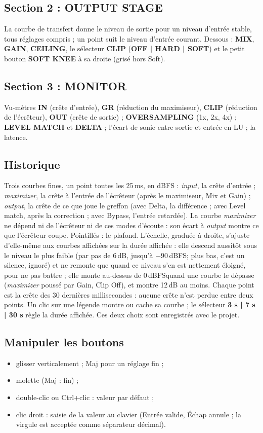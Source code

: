 \documentclass[a4paper,11pt]{article}
\newcommand{\ctl}[1]{\textsf{\textbf{#1}}}   %
\newcommand{\dB}{\,dB}
\newcommand{\dBFS}{\,dBFS}
\begin{document}
\subsection{Section 2 : OUTPUT STAGE}
La courbe de transfert donne le niveau de sortie pour un niveau d'entrée stable, tous réglages
compris ; un point suit le niveau d'entrée courant. Dessous : \ctl{MIX}, \ctl{GAIN},
\ctl{CEILING}, le sélecteur \ctl{CLIP} (\ctl{OFF | HARD | SOFT}) et le petit bouton
\ctl{SOFT KNEE} à sa droite (grisé hors Soft).

\subsection{Section 3 : MONITOR}
Vu-mètres \ctl{IN} (crête d'entrée), \ctl{GR} (réduction du maximiseur), \ctl{CLIP} (réduction
de l'écrêteur), \ctl{OUT} (crête de sortie) ; \ctl{OVERSAMPLING} (1x, 2x, 4x) ; \ctl{LEVEL
MATCH} et \ctl{DELTA} ; l'écart de sonie entre sortie et entrée en LU ; la latence.

\subsection{Historique}
Trois courbes fines, un point toutes les 25\,ms, en dBFS : \emph{input}, la crête d'entrée ;
\emph{maximizer}, la crête à l'entrée de l'écrêteur (après le maximiseur, Mix et Gain) ;
\emph{output}, la crête de ce que joue le greffon (avec Delta, la différence ; avec Level match,
après la correction ; avec Bypass, l'entrée retardée). La courbe \emph{maximizer} ne dépend ni de
l'écrêteur ni de ces modes d'écoute : son écart à \emph{output} montre ce que l'écrêteur coupe.
Pointillés : le plafond. L'échelle, graduée à droite, s'ajuste
d'elle-même aux courbes affichées sur la durée affichée : elle descend aussitôt sous le niveau le
plus faible (par pas de 6\dB, jusqu'à $-90$\dBFS ; plus bas, c'est un silence, ignoré) et ne
remonte que quand ce niveau s'en est nettement éloigné, pour ne pas battre ; elle monte au-dessus
de 0\dBFS quand une courbe le dépasse (\emph{maximizer} poussé par Gain, Clip Off), et montre 12\dB{} au moins. Chaque point est la crête des 30 dernières millisecondes : aucune crête n'est perdue
entre deux points. Un clic sur une légende montre ou cache sa courbe ; le sélecteur \ctl{3 s |
7 s | 30 s} règle la durée affichée. Ces deux choix sont enregistrés avec le projet.

\subsection{Manipuler les boutons}
\begin{itemize}
\item glisser verticalement ; \textsf{Maj} pour un réglage fin ;
\item molette (\textsf{Maj} : fin) ;
\item double-clic ou \textsf{Ctrl}+clic : valeur par défaut ;
\item clic droit : saisie de la valeur au clavier (\textsf{Entrée} valide, \textsf{Échap}
  annule ; la virgule est acceptée comme séparateur décimal).
\end{itemize}
\end{document}

